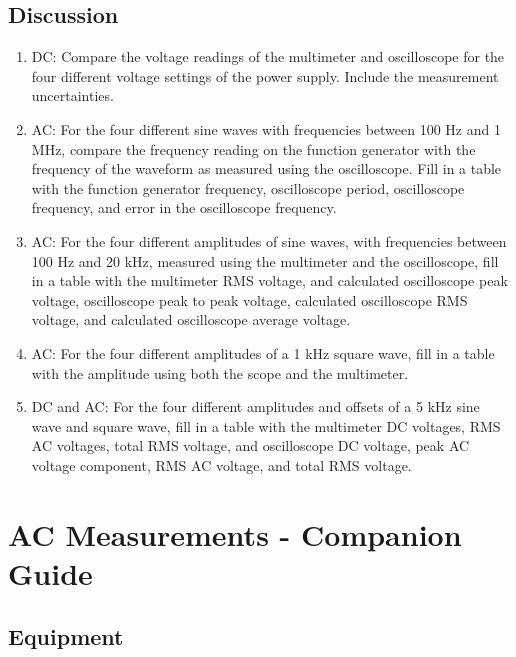 \section{{\bf Discussion}}
\begin{enumerate}[resume]
\item DC: Compare the voltage readings of the multimeter and oscilloscope for the four different voltage settings of the power supply. Include the measurement uncertainties.

\item AC: For the four different sine waves with frequencies between 100 Hz and 1 MHz, compare the frequency reading on the function generator with the frequency of the waveform as measured using the oscilloscope. Fill in a table with the function generator frequency, oscilloscope period, oscilloscope frequency, and error in the oscilloscope frequency.

\item AC: For the four different amplitudes of sine waves, with frequencies between 100 Hz and 20 kHz, measured using the multimeter and the oscilloscope, fill in a table with the multimeter RMS voltage, and calculated oscilloscope peak voltage, oscilloscope peak to peak voltage, calculated oscilloscope RMS voltage, and calculated oscilloscope average voltage.

\item AC: For the four different amplitudes of a 1 kHz square wave, fill in a table with the amplitude using both the scope and the multimeter.

\item DC and AC: For the four different amplitudes and offsets of a 5 kHz sine wave and square wave, fill in a table with the multimeter DC voltages, RMS AC voltages, total RMS voltage, and oscilloscope DC voltage, peak AC voltage component, RMS AC voltage, and total RMS voltage.
\end{enumerate}


\AtEndDocument{\clearpage\ifodd\value{page}\else\null\clearpage\fi} %



\chapter{AC Measurements - Companion Guide}

\section{Equipment}

